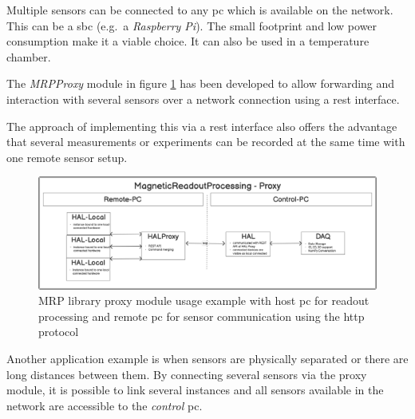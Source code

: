 Multiple sensors can be connected to any \gls{pc} which is available on
the network. This can be a \gls{sbc} (e.g.~a \emph{Raspberry Pi}). The
small footprint and low power consumption make it a viable choice. It
can also be used in a temperature chamber.

The \emph{MRPProxy} module in figure
\ref{MRP_library_proxy_module_usage_example_with_host_(+pc)_for_readout_processing_and_remote_(+pc)_for_sensor_communication_using_the_http_protocol.png}
has been developed to allow forwarding and interaction with several
sensors over a network connection using a \gls{rest} interface.

The approach of implementing this via a \gls{rest} interface also offers
the advantage that several measurements or experiments can be recorded
at the same time with one remote sensor setup.

\begin{figure}
\centering
\includegraphics{./generated_images/border_MRP_library_proxy_module_usage_example_with_host_(+pc)_for_readout_processing_and_remote_(+pc)_for_sensor_communication_using_the_http_protocol.png}
\caption{MRP library proxy module usage example with host \gls{pc} for
readout processing and remote \gls{pc} for sensor communication using
the http protocol
\label{MRP_library_proxy_module_usage_example_with_host_(+pc)_for_readout_processing_and_remote_(+pc)_for_sensor_communication_using_the_http_protocol.png}}
\end{figure}

Another application example is when sensors are physically separated or
there are long distances between them. By connecting several sensors via
the proxy module, it is possible to link several instances and all
sensors available in the network are accessible to the \emph{control}
\gls{pc}.

